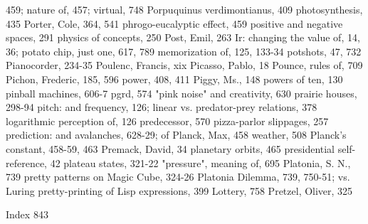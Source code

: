   459; nature of, 457; virtual, 748               Porpuquinus verdimontianus, 409
photosynthesis, 435                               Porter, Cole, 364, 541
phrogo-eucalyptic effect, 459                     positive and negative spaces, 291
physics of concepts, 250                          Post, Emil, 263
Ir: changing the value of, 14, 36;                potato chip, just one, 617, 789
  memorization of, 125, 133-34                    potshots, 47, 732
Pianocorder, 234-35                               Poulenc, Francis, xix
Picasso, Pablo, 18                                Pounce, rules of, 709
Pichon, Frederic, 185, 596                        power, 408, 411
Piggy, Ms., 148                                   powers of ten, 130
pinball machines, 606-7                           pgrd, 574
"pink noise" and creativity, 630                  prairie houses, 298-94
pitch: and frequency, 126; linear vs.             predator-prey relations, 378
  logarithmic perception of, 126                  predecessor, 570
pizza-parlor slippages, 257                       prediction: and avalanches, 628-29; of
Planck, Max, 458                                   weather, 508
Planck's constant, 458-59, 463                    Premack, David, 34
planetary orbits, 465                             presidential self-reference, 42
plateau states, 321-22                            "pressure", meaning of, 695
Platonia, S. N., 739                              pretty patterns on Magic Cube, 324-26
Platonia Dilemma, 739, 750-51; vs. Luring         pretty-printing of Lisp expressions, 399
  Lottery, 758                                    Pretzel, Oliver, 325

 Index                                                                                      843

